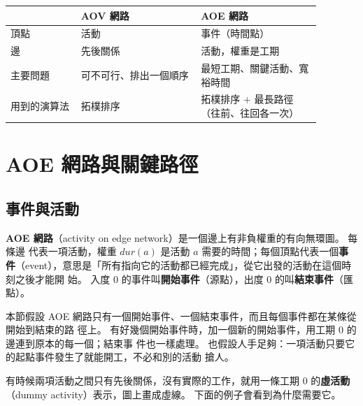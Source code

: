 \begin{center}
\begin{tabular}{>{\raggedright\arraybackslash}p{0.2\linewidth}>{\raggedright\arraybackslash}p{0.34\linewidth}>{\raggedright\arraybackslash}p{0.34\linewidth}}
\toprule
 & AOV 網路 & AOE 網路 \\
\midrule
頂點 & 活動 & 事件（時間點） \\
邊 & 先後關係 & 活動，權重是工期 \\
主要問題 & 可不可行、排出一個順序 & 最短工期、關鍵活動、寬裕時間 \\
用到的演算法 & 拓樸排序 & 拓樸排序 $+$ 最長路徑（往前、往回各一次） \\
\bottomrule
\end{tabular}
\end{center}

\section{AOE 網路與關鍵路徑}
\label{sec:tps-aoe}

\subsection{事件與活動}

\begin{definition}[AOE 網路]
\label{def:tps-aoe}
\textbf{AOE 網路}（activity on edge network）是一個邊上有非負權重的有向無環圖。 每條邊
代表一項活動，權重 $\mathit{dur}(a)$ 是活動 $a$ 需要的時間；每個頂點代表一個\textbf{事
件}（event），意思是「所有指向它的活動都已經完成」，從它出發的活動在這個時刻之後才能開
始。 入度 $0$ 的事件叫\textbf{開始事件}（源點），出度 $0$ 的叫\textbf{結束事件}（匯點）。
\end{definition}

本節假設 AOE 網路只有一個開始事件、一個結束事件，而且每個事件都在某條從開始到結束的路
徑上。 有好幾個開始事件時，加一個新的開始事件，用工期 $0$ 的邊連到原本的每一個；結束事
件也一樣處理。 也假設人手足夠：一項活動只要它的起點事件發生了就能開工，不必和別的活動
搶人。

有時候兩項活動之間只有先後關係，沒有實際的工作，就用一條工期 $0$ 的\textbf{虛活動}
（dummy activity）表示，圖上畫成虛線。 下面的例子會看到為什麼需要它。


